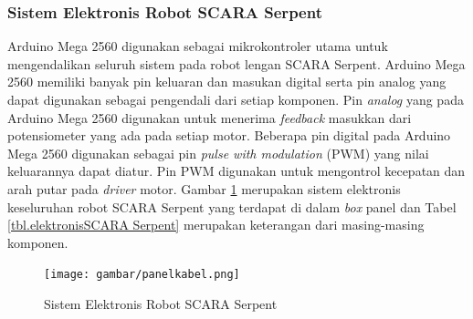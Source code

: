 \subsubsection{Sistem Elektronis Robot SCARA Serpent}
Arduino Mega 2560 digunakan sebagai mikrokontroler utama untuk mengendalikan seluruh sistem pada robot lengan SCARA Serpent. Arduino Mega 2560 memiliki banyak pin keluaran dan masukan digital serta pin analog yang dapat digunakan sebagai pengendali dari setiap komponen. Pin \textit{analog} yang pada Arduino Mega 2560 digunakan untuk menerima \textit{feedback} masukkan dari potensiometer yang ada pada setiap motor. Beberapa pin digital pada Arduino Mega 2560 digunakan sebagai pin \textit{pulse with modulation} (PWM) yang nilai keluarannya dapat diatur. Pin PWM digunakan untuk mengontrol kecepatan dan arah putar pada \textit{driver} motor. Gambar \ref{pic.boxpanelkabel} merupakan sistem elektronis keseluruhan robot SCARA Serpent yang terdapat di dalam \textit{box} panel dan Tabel \ref{tbl.elektronisSCARA Serpent} merupakan keterangan dari masing-masing komponen.
\begin{figure}[H]
	\centering
	\texttt{[image: gambar/panelkabel.png]}
	\caption{Sistem Elektronis Robot SCARA Serpent}
	\label{pic.boxpanelkabel}
\end{figure}

